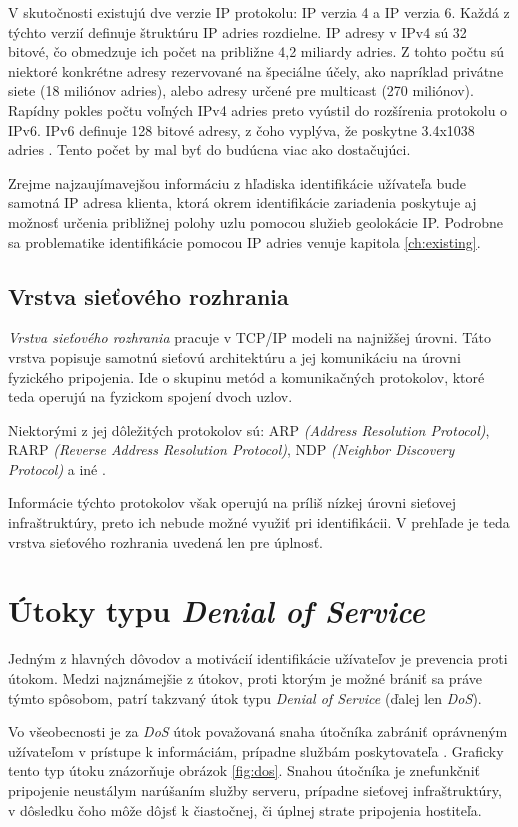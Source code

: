 \documentclass[
  printed, %
  table,   %
  lof,     %
  nolot,   %
  nocover
]{fithesis3}
\begin{document}
V skutočnosti existujú dve verzie IP protokolu: IP verzia 4 a IP verzia 6.
Každá z týchto verzií definuje štruktúru IP adries rozdielne. IP adresy v IPv4
sú 32 bitové, čo obmedzuje ich počet na približne 4,2 miliardy adries. Z tohto
počtu sú niektoré konkrétne adresy rezervované na špeciálne účely, ako napríklad
privátne siete (18 miliónov adries), alebo adresy určené pre multicast
(270 miliónov). Rapídny pokles počtu voľných IPv4 adries preto vyústil do
rozšírenia protokolu o IPv6. IPv6 definuje 128 bitové adresy, z čoho vyplýva,
že poskytne 3.4x1038 adries \cite{rfc1752}. Tento počet by mal byť do budúcna viac ako
dostačujúci.

Zrejme najzaujímavejšou informáciu z hľadiska identifikácie užívateľa bude samotná IP
adresa klienta, ktorá okrem identifikácie zariadenia poskytuje aj možnosť určenia
približnej polohy uzlu pomocou služieb geolokácie IP. Podrobne sa problematike
identifikácie pomocou IP adries venuje kapitola \ref{ch:existing}. 

\section{Vrstva sieťového rozhrania}
\textit{Vrstva sieťového rozhrania} pracuje v TCP/IP modeli na najnižšej úrovni.
Táto vrstva popisuje samotnú sieťovú architektúru a jej komunikáciu na úrovni
fyzického pripojenia. Ide o skupinu metód a komunikačných protokolov, ktoré 
teda operujú na fyzickom spojení dvoch uzlov.

Niektorými z jej dôležitých protokolov sú: ARP
\textit{(Address Resolution Protocol)}, RARP
\textit{(Reverse Address Resolution Protocol)},
NDP \textit{(Neighbor Discovery Protocol)} a iné \cite{rfc1123}.

Informácie týchto protokolov však operujú na príliš nízkej úrovni sieťovej
infraštruktúry, preto ich nebude možné využiť pri identifikácii. V prehľade je 
teda vrstva sieťového rozhrania uvedená len pre úplnosť.

\chapter{Útoky typu \textit{Denial of Service}}
\label{ch:dos}
Jedným z hlavných dôvodov a motivácií identifikácie užívateľov je prevencia
proti útokom. Medzi najznámejšie z útokov, proti ktorým je možné brániť sa
práve týmto spôsobom, patrí takzvaný útok typu \textit{Denial of Service}
(ďalej len \textit{DoS}).

Vo všeobecnosti je za \textit{DoS} útok považovaná snaha útočníka zabrániť
oprávneným užívateľom v prístupe k informáciám, prípadne službám poskytovateľa \cite{McDowell:DoS}.
Graficky tento typ útoku znázorňuje obrázok \ref{fig:dos}.
Snahou útočníka je znefunkčniť pripojenie neustálym narúšaním služby serveru,
prípadne sieťovej infraštruktúry, v dôsledku čoho môže dôjsť k čiastočnej, či
úplnej strate pripojenia hostiteľa. 
\end{document}
